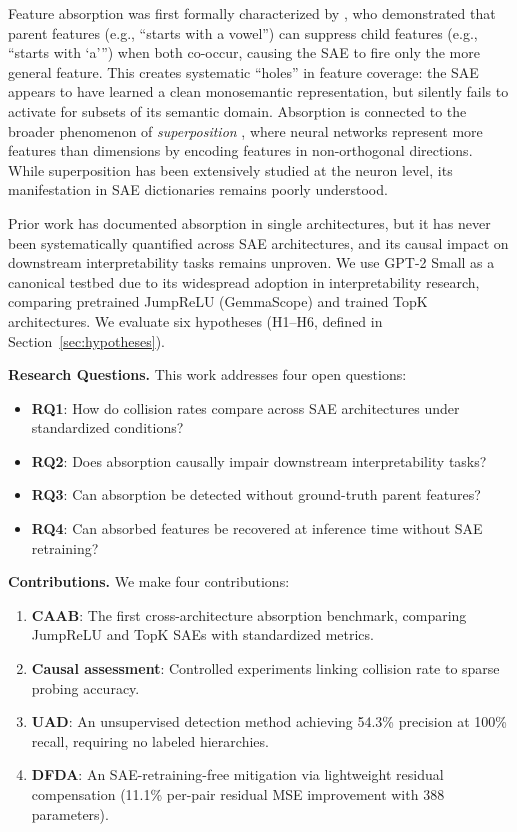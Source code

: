 \documentclass{article}
\begin{document}
Feature absorption was first formally characterized by \citet{chanin2024causal}, who demonstrated that parent features (e.g., ``starts with a vowel'') can suppress child features (e.g., ``starts with `a''') when both co-occur, causing the SAE to fire only the more general feature. This creates systematic ``holes'' in feature coverage: the SAE appears to have learned a clean monosemantic representation, but silently fails to activate for subsets of its semantic domain. Absorption is connected to the broader phenomenon of \textit{superposition} \citep{elhage2022superposition}, where neural networks represent more features than dimensions by encoding features in non-orthogonal directions. While superposition has been extensively studied at the neuron level, its manifestation in SAE dictionaries remains poorly understood.

Prior work has documented absorption in single architectures, but it has never been systematically quantified across SAE architectures, and its causal impact on downstream interpretability tasks remains unproven. We use GPT-2 Small as a canonical testbed due to its widespread adoption in interpretability research, comparing pretrained JumpReLU (GemmaScope) and trained TopK architectures. We evaluate six hypotheses (H1--H6, defined in Section~\ref{sec:hypotheses}).

\textbf{Research Questions.} This work addresses four open questions:
\begin{itemize}
    \item \textbf{RQ1}: How do collision rates compare across SAE architectures under standardized conditions?
    \item \textbf{RQ2}: Does absorption causally impair downstream interpretability tasks?
    \item \textbf{RQ3}: Can absorption be detected without ground-truth parent features?
    \item \textbf{RQ4}: Can absorbed features be recovered at inference time without SAE retraining?
\end{itemize}

\textbf{Contributions.} We make four contributions:
\begin{enumerate}
    \item \textbf{CAAB}: The first cross-architecture absorption benchmark, comparing JumpReLU and TopK SAEs with standardized metrics.
    \item \textbf{Causal assessment}: Controlled experiments linking collision rate to sparse probing accuracy.
    \item \textbf{UAD}: An unsupervised detection method achieving 54.3\% precision at 100\% recall, requiring no labeled hierarchies.
    \item \textbf{DFDA}: An SAE-retraining-free mitigation via lightweight residual compensation (11.1\% per-pair residual MSE improvement with 388 parameters).
\end{enumerate}
\end{document}
